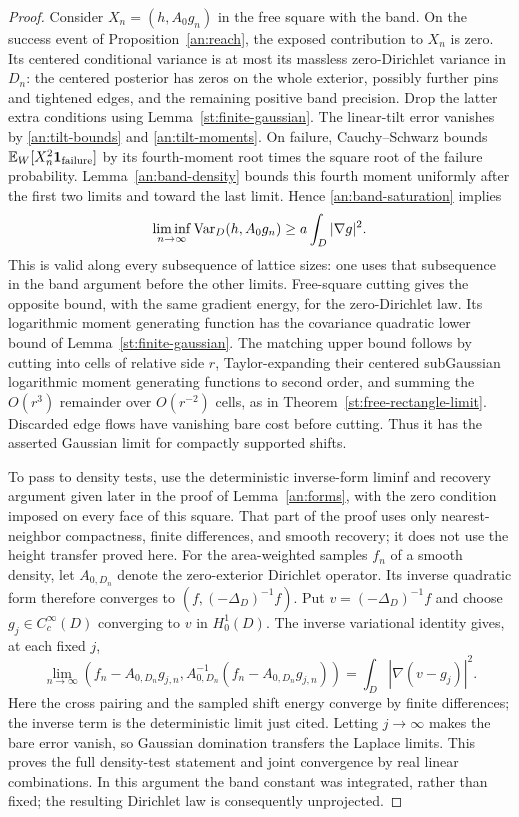 \begin{proof}
Consider $X_n=(h,A_0g_n)$ in the free square with the band.
On the success event of Proposition~\ref{an:reach}, the exposed
contribution to $X_n$ is zero.  Its centered conditional
variance is at most its massless zero-Dirichlet variance in
$D_n$: the centered posterior has zeros on the whole exterior,
possibly further pins and tightened edges, and the remaining
positive band precision.  Drop the latter extra conditions
using Lemma~\ref{st:finite-gaussian}.  The linear-tilt error
vanishes by \eqref{an:tilt-bounds} and
\eqref{an:tilt-moments}.  On failure, Cauchy--Schwarz bounds
$\mathbb E_W[X_n^2\mathbf 1_{\mathrm{failure}}]$ by its fourth-moment
root times the square root of the failure probability.
Lemma~\ref{an:band-density} bounds this fourth moment uniformly
after the first two limits and toward the last limit.  Hence
\eqref{an:band-saturation} implies
\begin{equation}
 \liminf_{n\to\infty}\operatorname{Var}_D(h,A_0g_n)
      \ge a\int_D|\nabla g|^2.
 \label{an:dirichlet-lower}
\end{equation}
This is valid along every subsequence of lattice sizes: one
uses that subsequence in the band argument before the other
limits.  Free-square cutting gives the opposite bound, with
the same gradient energy, for the zero-Dirichlet law.  Its
logarithmic moment generating function has the covariance
quadratic lower bound of Lemma~\ref{st:finite-gaussian}.
The matching upper bound follows by cutting into cells of
relative side $r$, Taylor-expanding their centered
subGaussian logarithmic moment generating functions to second
order, and summing the $O(r^3)$ remainder over $O(r^{-2})$
cells, as in Theorem~\ref{st:free-rectangle-limit}.  Discarded
edge flows have vanishing bare cost before cutting.  Thus it
has the asserted Gaussian limit for compactly supported shifts.

To pass to density tests, use the deterministic inverse-form
liminf and recovery argument given later in the proof of
Lemma~\ref{an:forms}, with the zero condition imposed on every
face of this square.  That part of the proof uses only
nearest-neighbor compactness, finite differences, and smooth
recovery; it does not use the height transfer proved here.
For the area-weighted samples $f_n$ of a smooth density, let
$A_{0,D_n}$ denote the zero-exterior Dirichlet operator.  Its inverse
quadratic form therefore converges to
$(f,(-\Delta_D)^{-1}f)$.  Put $v=(-\Delta_D)^{-1}f$ and choose
$g_j\in C_c^\infty(D)$ converging to $v$ in $H_0^1(D)$.  The
inverse variational identity gives, at each fixed $j$,
\[
 \lim_{n\to\infty}
 (f_n-A_{0,D_n}g_{j,n},
 A_{0,D_n}^{-1}(f_n-A_{0,D_n}g_{j,n}))
 =\int_D|\nabla(v-g_j)|^2.
\]
Here the cross pairing and the sampled shift energy converge by
finite differences; the inverse term is the deterministic limit
just cited.  Letting $j\to\infty$ makes the bare error vanish,
so Gaussian domination transfers the Laplace limits.  This proves
the full density-test statement and
joint convergence by real linear combinations.  In this
argument the band constant was integrated, rather than fixed;
the resulting Dirichlet law is consequently unprojected.


\end{proof}
